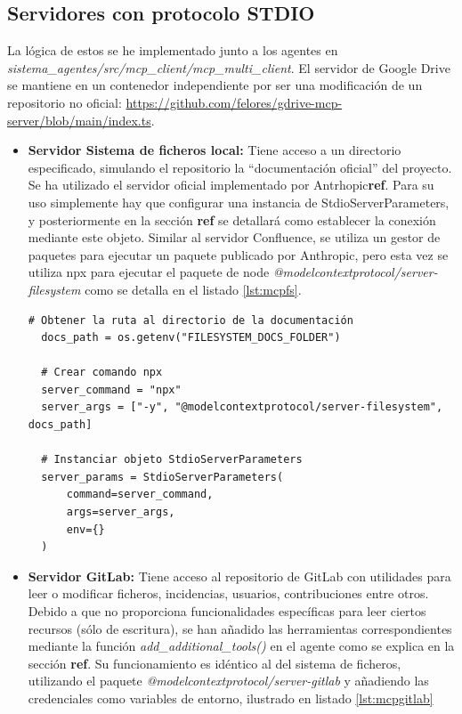 \subsection{Servidores con protocolo STDIO}
La lógica de estos se he implementado junto a los agentes en \textit{sistema\_agentes/src/mcp\_client/mcp\_multi\_client}. El servidor de Google Drive se mantiene en un contenedor independiente por ser una modificación de un repositorio no oficial: \url{https://github.com/felores/gdrive-mcp-server/blob/main/index.ts}.
\begin{itemize}
  \item\textbf{Servidor Sistema de ficheros local: }Tiene acceso a un directorio especificado, simulando el repositorio la ``documentación oficial'' del proyecto. 
    Se ha utilizado el servidor oficial implementado por Antrhopic\textbf{ref}. Para su uso simplemente hay que configurar una instancia de StdioServerParameters, y posteriormente en la sección \textbf{ref} se detallará como establecer la conexión mediante este objeto. Similar al servidor Confluence, se utiliza un gestor de paquetes para ejecutar un paquete publicado por Anthropic, pero esta vez se utiliza npx para ejecutar el paquete de node \textit{@modelcontextprotocol/server-filesystem} como se detalla en el listado \ref{lst:mcpfs}. 

\begin{lstlisting}[caption={Instanciado de StdioServerParameters para el servidor MCP de sistema de ficheros},label={lst:mcpfs}]
  # Obtener la ruta al directorio de la documentación 
  docs_path = os.getenv("FILESYSTEM_DOCS_FOLDER")

  # Crear comando npx
  server_command = "npx"
  server_args = ["-y", "@modelcontextprotocol/server-filesystem", docs_path]

  # Instanciar objeto StdioServerParameters 
  server_params = StdioServerParameters(
      command=server_command,
      args=server_args,
      env={}
  )
\end{lstlisting}

\item\textbf{Servidor GitLab: }Tiene acceso al repositorio de GitLab con utilidades para leer o modificar ficheros, incidencias, usuarios, contribuciones entre otros. Debido a que no proporciona funcionalidades específicas para leer ciertos recursos (sólo de escritura), se han añadido las herramientas correspondientes mediante la función \textit{add\_additional\_tools()} en el agente como se explica en la sección \textbf{ref}. Su funcionamiento es idéntico al del sistema de ficheros, utilizando el paquete \textit{@modelcontextprotocol/server-gitlab} y añadiendo las credenciales como variables de entorno, ilustrado en listado \ref{lst:mcpgitlab}


\end{itemize}
